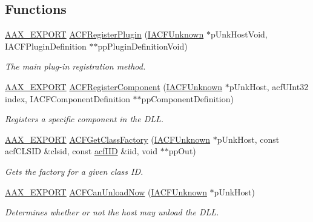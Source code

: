 \subsection*{Functions}
\begin{DoxyCompactItemize}
\item 
\mbox{\hyperlink{a00500_ac70085d71c555deff0dfb54c2b503f4c}{A\+A\+X\+\_\+\+E\+X\+P\+O\+RT}} \mbox{\hyperlink{a00500_aa455fa4d9a2236334d0fd959b4919788}{A\+C\+F\+Register\+Plugin}} (\mbox{\hyperlink{a01409}{I\+A\+C\+F\+Unknown}} $\ast$p\+Unk\+Host\+Void, I\+A\+C\+F\+Plugin\+Definition $\ast$$\ast$pp\+Plugin\+Definition\+Void)
\begin{DoxyCompactList}\small\item\em The main plug-\/in registration method. \end{DoxyCompactList}\item 
\mbox{\hyperlink{a00500_ac70085d71c555deff0dfb54c2b503f4c}{A\+A\+X\+\_\+\+E\+X\+P\+O\+RT}} \mbox{\hyperlink{a00500_a68950ea83fea9b46b8f3fef409355b71}{A\+C\+F\+Register\+Component}} (\mbox{\hyperlink{a01409}{I\+A\+C\+F\+Unknown}} $\ast$p\+Unk\+Host, acf\+U\+Int32 index, I\+A\+C\+F\+Component\+Definition $\ast$$\ast$pp\+Component\+Definition)
\begin{DoxyCompactList}\small\item\em Registers a specific component in the D\+LL. \end{DoxyCompactList}\item 
\mbox{\hyperlink{a00500_ac70085d71c555deff0dfb54c2b503f4c}{A\+A\+X\+\_\+\+E\+X\+P\+O\+RT}} \mbox{\hyperlink{a00500_a63cbe0222beee199dad20c26e79ebeaa}{A\+C\+F\+Get\+Class\+Factory}} (\mbox{\hyperlink{a01409}{I\+A\+C\+F\+Unknown}} $\ast$p\+Unk\+Host, const acf\+C\+L\+S\+ID \&clsid, const \mbox{\hyperlink{a00269_a59df0b41744eee7a066787aaedf97f67}{acf\+I\+ID}} \&iid, void $\ast$$\ast$pp\+Out)
\begin{DoxyCompactList}\small\item\em Gets the factory for a given class ID. \end{DoxyCompactList}\item 
\mbox{\hyperlink{a00500_ac70085d71c555deff0dfb54c2b503f4c}{A\+A\+X\+\_\+\+E\+X\+P\+O\+RT}} \mbox{\hyperlink{a00500_ae5327dbd8fd750c78eca3892831f4ad8}{A\+C\+F\+Can\+Unload\+Now}} (\mbox{\hyperlink{a01409}{I\+A\+C\+F\+Unknown}} $\ast$p\+Unk\+Host)
\begin{DoxyCompactList}\small\item\em Determines whether or not the host may unload the D\+LL. \end{DoxyCompactList}\item 
$$
\end{DoxyCompactItemize}

